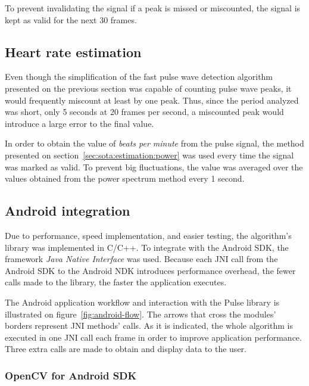 To prevent invalidating the signal if a peak is missed or miscounted,
the signal is kept as valid for the next 30 frames.

\subsection{Heart rate estimation} \label{sec:impl:estimation}

Even though the simplification of the fast pulse wave detection algorithm
presented on the previous section was capable of counting pulse wave peaks,
it would frequently miscount at least by one peak. Thus, since the period
analyzed was short, only 5 seconds at 20 frames per second, a miscounted peak
would introduce a large error to the final value.

In order to obtain the value of \emph{beats per minute} from the pulse signal,
the method presented on section~\ref{sec:sota:estimation:power} was used
every time the signal was marked as valid.
To prevent big fluctuations, the value was averaged over the values obtained
from the power spectrum method every 1 second.

\subsection{Android integration} \label{sec:impl:android}


Due to performance, speed implementation, and easier testing, the algorithm's
library was implemented in C/C++. To integrate with the Android SDK, the
framework \emph{Java Native Interface} was used. Because each JNI call from the
Android SDK to the Android NDK introduces performance overhead,
the fewer calls made to the library, the faster the application executes.

The Android application workflow and interaction with the Pulse library is
illustrated on figure~\ref{fig:android-flow}. The arrows that cross the
modules' borders represent JNI methods' calls. As it is indicated, the whole
algorithm is executed in one JNI call each frame in order to improve
application performance. Three extra calls are made to obtain and display
data to the user.

\subsubsection{OpenCV for Android SDK} \label{sec:impl:android:opencv}

